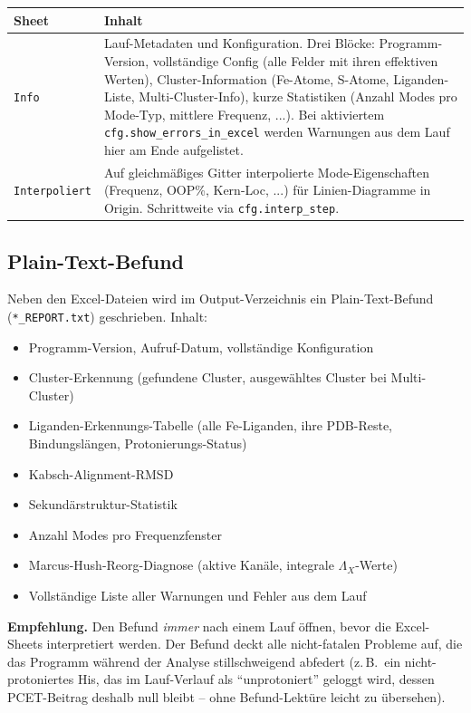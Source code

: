 \documentclass[11pt,a4paper,twoside]{article}
\theoremstyle{remark}
\begin{document}
\begin{longtable}{p{} p{}}
\toprule
\textbf{Sheet} & \textbf{Inhalt} \\
\midrule
\endhead

\texttt{Info} & Lauf-Metadaten und Konfiguration. Drei Bl\"ocke:
  Programm-Version, vollst\"andige Config (alle Felder mit ihren
  effektiven Werten), Cluster-Information (Fe-Atome, S-Atome,
  Liganden-Liste, Multi-Cluster-Info), kurze Statistiken (Anzahl
  Modes pro Mode-Typ, mittlere Frequenz, ...).
  Bei aktiviertem \texttt{cfg.show\_errors\_in\_excel} werden
  Warnungen aus dem Lauf hier am Ende aufgelistet. \\

\texttt{Interpoliert} & Auf gleichm\"a\ss iges Gitter interpolierte
  Mode-Eigenschaften (Frequenz, OOP\%, Kern-Loc, ...) f\"ur
  Linien-Diagramme in Origin. Schrittweite via
  \texttt{cfg.interp\_step}. \\
\bottomrule
\end{longtable}

\subsection{Plain-Text-Befund}
\label{sec:befund}

Neben den Excel-Dateien wird im Output-Verzeichnis ein
Plain-Text-Befund (\texttt{*\_REPORT.txt}) geschrieben. Inhalt:

\begin{itemize}
  \item Programm-Version, Aufruf-Datum, vollst\"andige Konfiguration
  \item Cluster-Erkennung (gefundene Cluster, ausgew\"ahltes Cluster
        bei Multi-Cluster)
  \item Liganden-Erkennungs-Tabelle (alle Fe-Liganden, ihre PDB-Reste,
        Bindungsl\"angen, Protonierungs-Status)
  \item Kabsch-Alignment-RMSD
  \item Sekund\"arstruktur-Statistik
  \item Anzahl Modes pro Frequenzfenster
  \item Marcus-Hush-Reorg-Diagnose (aktive Kan\"ale, integrale
        $\Lambda_X$-Werte)
  \item Vollst\"andige Liste aller Warnungen und Fehler aus dem Lauf
\end{itemize}

\begin{infobox}
\textbf{Empfehlung.} Den Befund \emph{immer} nach einem Lauf \"offnen,
bevor die Excel-Sheets interpretiert werden. Der Befund deckt alle
nicht-fatalen Probleme auf, die das Programm w\"ahrend der Analyse
stillschweigend abfedert (z.\,B.\ ein nicht-protoniertes His, das im
Lauf-Verlauf als ``unprotoniert'' geloggt wird, dessen PCET-Beitrag
deshalb null bleibt -- ohne Befund-Lekt\"ure leicht zu \"ubersehen).
\end{infobox}
\end{document}
